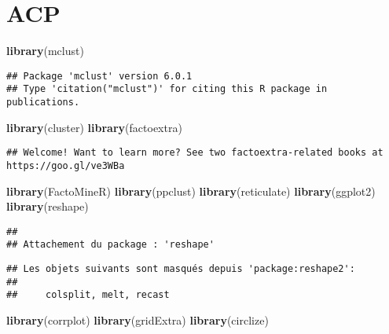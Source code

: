 \documentclass[
]{article}
\newenvironment{Shaded}{\begin{snugshade}}{\end{snugshade}}
\newcommand{\FunctionTok}[1]{\textcolor[rgb]{0.13,0.29,0.53}{\textbf{#1}}}
\newcommand{\NormalTok}[1]{#1}
\begin{document}
\hypertarget{acp}{%
\section{ACP}\label{acp}}

\begin{Shaded}
\begin{Highlighting}[]
\FunctionTok{library}\NormalTok{(mclust)}
\end{Highlighting}
\end{Shaded}

\begin{verbatim}
## Package 'mclust' version 6.0.1
## Type 'citation("mclust")' for citing this R package in publications.
\end{verbatim}

\begin{Shaded}
\begin{Highlighting}[]
\FunctionTok{library}\NormalTok{(cluster)}
\FunctionTok{library}\NormalTok{(factoextra)}
\end{Highlighting}
\end{Shaded}

\begin{verbatim}
## Welcome! Want to learn more? See two factoextra-related books at https://goo.gl/ve3WBa
\end{verbatim}

\begin{Shaded}
\begin{Highlighting}[]
\FunctionTok{library}\NormalTok{(FactoMineR)}
\FunctionTok{library}\NormalTok{(ppclust)}
\FunctionTok{library}\NormalTok{(reticulate)}
\FunctionTok{library}\NormalTok{(ggplot2)}
\FunctionTok{library}\NormalTok{(reshape)}
\end{Highlighting}
\end{Shaded}

\begin{verbatim}
## 
## Attachement du package : 'reshape'
\end{verbatim}

\begin{verbatim}
## Les objets suivants sont masqués depuis 'package:reshape2':
## 
##     colsplit, melt, recast
\end{verbatim}

\begin{Shaded}
\begin{Highlighting}[]
\FunctionTok{library}\NormalTok{(corrplot)}
\FunctionTok{library}\NormalTok{(gridExtra)}
\FunctionTok{library}\NormalTok{(circlize)}
\end{Highlighting}
\end{Shaded}
\end{document}
